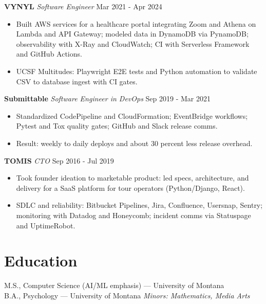 \documentclass[10pt]{article}
\begin{document}
\noindent\textbf{VYNYL} \textit{Software Engineer} \hfill Mar 2021 - Apr 2024\par
\begin{itemize}
  \item Built AWS services for a healthcare portal integrating Zoom and Athena on Lambda and API Gateway; modeled data in DynamoDB via PynamoDB; observability with X-Ray and CloudWatch; CI with Serverless Framework and GitHub Actions.
  \item UCSF Multitudes: Playwright E2E tests and Python automation to validate CSV to database ingest with CI gates.
\end{itemize}

\noindent\textbf{Submittable} \textit{Software Engineer in DevOps} \hfill Sep 2019 - Mar 2021\par
\begin{itemize}
  \item Standardized CodePipeline and CloudFormation; EventBridge workflows; Pytest and Tox quality gates; GitHub and Slack release comms.
  \item Result: weekly to daily deploys and about 30 percent less release overhead.
\end{itemize}

\noindent\textbf{TOMIS} \textit{CTO} \hfill Sep 2016 - Jul 2019\par
\begin{itemize}
  \item Took founder ideation to marketable product: led specs, architecture, and delivery for a SaaS platform for tour operators (Python/Django, React).
  \item SDLC and reliability: Bitbucket Pipelines, Jira, Confluence, Usersnap, Sentry; monitoring with Datadog and Honeycomb; incident comms via Statuspage and UptimeRobot.
\end{itemize}

\section*{Education}
M.S., Computer Science (AI/ML emphasis) — University of Montana \\
B.A., Psychology — University of Montana \quad \emph{Minors: Mathematics, Media Arts}
\end{document}
